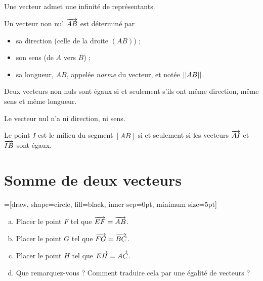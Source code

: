 \begin{remarque}
  Une vecteur admet une infinité de représentants.
\end{remarque}

\begin{propriete}
  Un vecteur non nul $\overrightarrow{AB}$ est déterminé par 
  \begin{itemize}
    \item sa direction (celle de la droite $(AB)$) ;
    \item son sens (de $A$ vers $B$) ;
    \item sa longueur, $AB$, appelée \emph{norme} du vecteur, et notée $\left|\left|AB\right|\right|$.
  \end{itemize}
\end{propriete}

\begin{corollaire}
  Deux vecteurs non nuls sont égaux si et seulement s'ils ont même direction, même sens et même longueur.
\end{corollaire}

\begin{remarque}
  Le vecteur nul n'a ni direction, ni sens.
\end{remarque}

\begin{propriete}
  Le point $I$ est le milieu du segment $[AB]$ si et seulement si les vecteurs $\overrightarrow{AI}$ et $\overrightarrow{IB}$ sont égaux.
\end{propriete}

\section{Somme de deux vecteurs}

\begin{activite}
=[draw, shape=circle, fill=black, inner sep=0pt, minimum size=5pt]

\begin{enumerate}[(a)]
  \item Placer le point $F$ tel que $\overrightarrow{EF}=\overrightarrow{AB}$.
  \item Placer le point $G$ tel que $\overrightarrow{FG}=\overrightarrow{BC}$.
  \item Placer le point $H$ tel que $\overrightarrow{EH}=\overrightarrow{AC}$.
  \item Que remarquez-vous ? Comment traduire cela par une égalité de vecteurs ?
\end{enumerate}
\end{activite}

